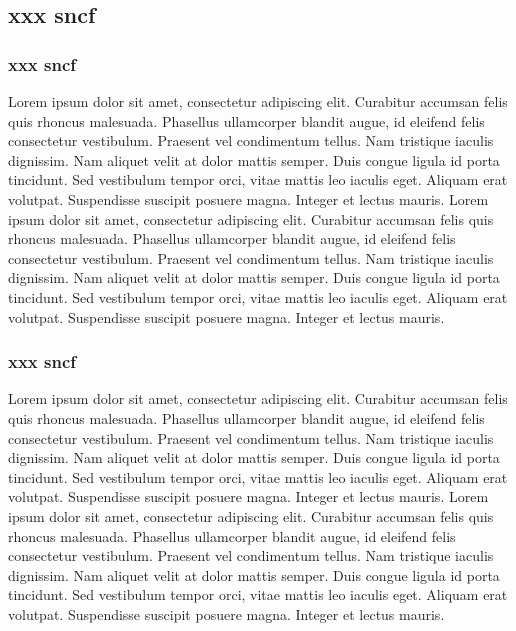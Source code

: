 \documentclass[12pt, a4paper]{book}
\newcommand\apparat[2]{\edtext{#1}{\Afootnote{#2}}}
\newcommand\apparatB[2]{\edtext{#1}{\Bfootnote{#2}}}
\begin{document}
\begin{pages}
\begin{Leftside}
\beginnumbering
\pstart
\subsection{xxx sncf}
\subsubsection{xxx sncf}
\pend
\pstart
\begin{ledgroup}
\skipnumbering
Lorem ipsum dolor sit amet, consectetur adipiscing elit. Curabitur accumsan felis quis rhoncus malesuada. Phasellus ullamcorper blandit augue, id eleifend felis consectetur vestibulum. Praesent vel condimentum tellus. Nam tristique iaculis dignissim. Nam aliquet velit at dolor mattis semper. Duis congue ligula id porta tincidunt. Sed vestibulum tempor orci, vitae mattis leo iaculis eget. Aliquam erat volutpat. Suspendisse suscipit posuere magna. Integer et lectus mauris. \apparat{aaa}{eeee}
Lorem ipsum dolor sit amet, consectetur adipiscing elit. Curabitur accumsan felis quis rhoncus malesuada. Phasellus ullamcorper blandit augue, id eleifend felis consectetur vestibulum. Praesent vel condimentum tellus. Nam tristique iaculis dignissim. Nam aliquet velit at dolor mattis semper. Duis congue ligula id porta tincidunt. Sed vestibulum tempor orci, vitae mattis leo iaculis eget. Aliquam erat volutpat. Suspendisse suscipit posuere magna. Integer et lectus mauris. \apparatB{aaa}{eeee}
\end{ledgroup}
\pend
\pstart
\subsubsection{xxx sncf}
\pend
\pstart
\begin{ledgroup}
\skipnumbering
Lorem ipsum dolor sit amet, consectetur adipiscing elit. Curabitur accumsan felis quis rhoncus malesuada. Phasellus ullamcorper blandit augue, id eleifend felis consectetur vestibulum. Praesent vel condimentum tellus. Nam tristique iaculis dignissim. Nam aliquet velit at dolor mattis semper. Duis congue ligula id porta tincidunt. Sed vestibulum tempor orci, vitae mattis leo iaculis eget. Aliquam erat volutpat. Suspendisse suscipit posuere magna. Integer et lectus mauris. \apparat{aaa}{eeee}
Lorem ipsum dolor sit amet, consectetur adipiscing elit. Curabitur accumsan felis quis rhoncus malesuada. Phasellus ullamcorper blandit augue, id eleifend felis consectetur vestibulum. Praesent vel condimentum tellus. Nam tristique iaculis dignissim. Nam aliquet velit at dolor mattis semper. Duis congue ligula id porta tincidunt. Sed vestibulum tempor orci, vitae mattis leo iaculis eget. Aliquam erat volutpat. Suspendisse suscipit posuere magna. Integer et lectus mauris. \apparatB{aaa}{eeee}
\end{ledgroup}
\pend
\pstart

\end{Leftside}
\end{pages}
\end{document}
